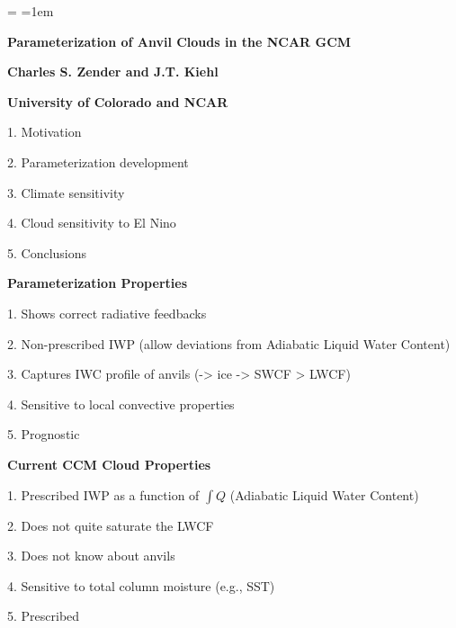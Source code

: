 

\magnification=
\nopagenumbers
\parskip=12pt
\parindent=1em
\overfullrule=0pt
\raggedright

\centerline{\bf Parameterization of Anvil Clouds in the NCAR GCM}
\centerline{\bf Charles S. Zender and J.T. Kiehl}
\centerline{\bf University of Colorado and NCAR}
\medskip

\item{1.} Motivation
\item{2.} Parameterization development
\item{3.} Climate sensitivity
\item{4.} Cloud sensitivity to El Nino
\item{5.} Conclusions

\vfill\eject

\centerline{\bf Parameterization Properties}
\medskip

\item{1.} Shows correct radiative feedbacks
\item{2.} Non-prescribed IWP (allow deviations from Adiabatic Liquid Water Content)
\item{3.} Captures IWC profile of anvils (-> ice -> SWCF > LWCF)
\item{4.} Sensitive to local convective properties
\item{5.} Prognostic

\vfill\eject

\centerline{\bf Current CCM Cloud Properties}
\medskip

\item{1.} Prescribed IWP as a function of $\int Q$ (Adiabatic Liquid Water Content)
\item{2.} Does not quite saturate the LWCF
\item{3.} Does not know about anvils
\item{4.} Sensitive to total column moisture (e.g., SST)
\item{5.} Prescribed

